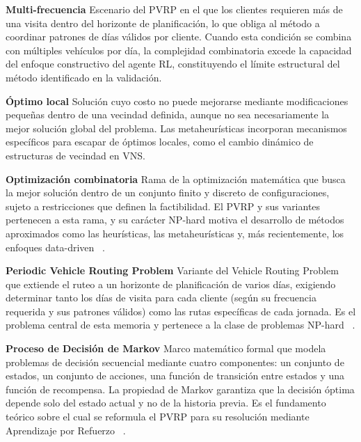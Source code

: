 {{\hangindent=1.5cm \hypertarget{glo:multifrec}{\textbf{Multi-frecuencia}}
Escenario del PVRP en el que los clientes requieren más de una visita dentro del horizonte de planificación, lo que obliga al método a coordinar patrones de días válidos por cliente. Cuando esta condición se combina con múltiples vehículos por día, la complejidad combinatoria excede la capacidad del enfoque constructivo del agente RL, constituyendo el límite estructural del método identificado en la validación.

\hangindent=1.5cm \hypertarget{glo:optimolocal}{\textbf{Óptimo local}}
Solución cuyo costo no puede mejorarse mediante modificaciones pequeñas dentro de una vecindad definida, aunque no sea necesariamente la mejor solución global del problema. Las metaheurísticas incorporan mecanismos específicos para escapar de óptimos locales, como el cambio dinámico de estructuras de vecindad en VNS.

\hangindent=1.5cm \hypertarget{glo:optcombinatoria}{\textbf{Optimización combinatoria}}
Rama de la optimización matemática que busca la mejor solución dentro de un conjunto finito y discreto de configuraciones, sujeto a restricciones que definen la factibilidad. El PVRP y sus variantes pertenecen a esta rama, y su carácter NP-hard motiva el desarrollo de métodos aproximados como las heurísticas, las metaheurísticas y, más recientemente, los enfoques data-driven ~\cite{bengio2020machinelearningcombinatorialoptimization}.

\hangindent=1.5cm \hypertarget{glo:pvrp}{\textbf{Periodic Vehicle Routing Problem}}
Variante del Vehicle Routing Problem que extiende el ruteo a un horizonte de planificación de varios días, exigiendo determinar tanto los días de visita para cada cliente (según su frecuencia requerida y sus patrones válidos) como las rutas específicas de cada jornada. Es el problema central de esta memoria y pertenece a la clase de problemas NP-hard ~\cite{HEMMELMAYR2009791}.

\hangindent=1.5cm \hypertarget{glo:mdp}{\textbf{Proceso de Decisión de Markov}}
Marco matemático formal que modela problemas de decisión secuencial mediante cuatro componentes: un conjunto de estados, un conjunto de acciones, una función de transición entre estados y una función de recompensa. La propiedad de Markov garantiza que la decisión óptima depende solo del estado actual y no de la historia previa. Es el fundamento teórico sobre el cual se reformula el PVRP para su resolución mediante Aprendizaje por Refuerzo ~\cite{SuttonBarto2014}.

}}
